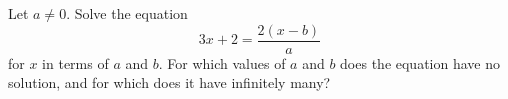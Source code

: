 Let $a\ne0$. Solve the equation
\[
3x+2=\dfrac{2(x-b)}{a}
\]
for $x$ in terms of $a$ and $b$. For which values of $a$ and $b$ does the equation have no solution, and for which does it have infinitely many?

